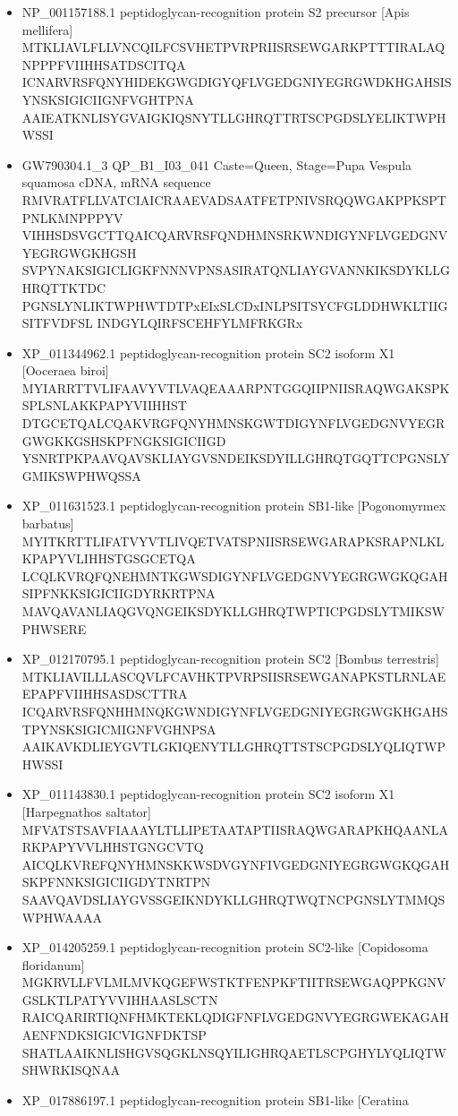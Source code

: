 \documentclass[]{article}
\providecommand{\tightlist}{%
  \setlength{\itemsep}{0pt}\setlength{\parskip}{0pt}}
\begin{document}
\begin{itemize}
\tightlist
\item
  NP\_001157188.1 peptidoglycan-recognition protein S2 precursor {[}Apis
  mellifera{]}
  MTKLIAVLFLLVNCQILFCSVHETPVRPRIISRSEWGARKPTTTIRALAQNPPPFVIIHHSATDSCITQA
  ICNARVRSFQNYHIDEKGWGDIGYQFLVGEDGNIYEGRGWDKHGAHSISYNSKSIGICIIGNFVGHTPNA
  AAIEATKNLISYGVAIGKIQSNYTLLGHRQTTRTSCPGDSLYELIKTWPHWSSI
\item
  GW790304.1\_3 QP\_B1\_I03\_041 Caste=Queen, Stage=Pupa Vespula
  squamosa cDNA, mRNA sequence
  RMVRATFLLVATCIAICRAAEVADSAATFETPNIVSRQQWGAKPPKSPTPNLKMNPPPYV
  VIHHSDSVGCTTQAICQARVRSFQNDHMNSRKWNDIGYNFLVGEDGNVYEGRGWGKHGSH
  SVPYNAKSIGICLIGKFNNNVPNSASIRATQNLIAYGVANNKIKSDYKLLGHRQTTKTDC
  PGNSLYNLIKTWPHWTDTPxEIxSLCDxINLPSITSYCFGLDDHWKLTIIGSITFVDFSL
  INDGYLQIRFSCEHFYLMFRKGRx
\item
  XP\_011344962.1 peptidoglycan-recognition protein SC2 isoform X1
  {[}Ooceraea biroi{]}
  MYIARRTTVLIFAAVYVTLVAQEAAARPNTGGQIIPNIISRAQWGAKSPKSPLSNLAKKPAPYVIIHHST
  DTGCETQALCQAKVRGFQNYHMNSKGWTDIGYNFLVGEDGNVYEGRGWGKKGSHSKPFNGKSIGICIIGD
  YSNRTPKPAAVQAVSKLIAYGVSNDEIKSDYILLGHRQTGQTTCPGNSLYGMIKSWPHWQSSA
\item
  XP\_011631523.1 peptidoglycan-recognition protein SB1-like
  {[}Pogonomyrmex barbatus{]}
  MYITKRTTLIFATVYVTLIVQETVATSPNIISRSEWGARAPKSRAPNLKLKPAPYVLIHHSTGSGCETQA
  LCQLKVRQFQNEHMNTKGWSDIGYNFLVGEDGNVYEGRGWGKQGAHSIPFNKKSIGICIIGDYRKRTPNA
  MAVQAVANLIAQGVQNGEIKSDYKLLGHRQTWPTICPGDSLYTMIKSWPHWSERE
\item
  XP\_012170795.1 peptidoglycan-recognition protein SC2 {[}Bombus
  terrestris{]}
  MTKLIAVILLLASCQVLFCAVHKTPVRPSIISRSEWGANAPKSTLRNLAEEPAPFVIIHHSASDSCTTRA
  ICQARVRSFQNHHMNQKGWNDIGYNFLVGEDGNIYEGRGWGKHGAHSTPYNSKSIGICMIGNFVGHNPSA
  AAIKAVKDLIEYGVTLGKIQENYTLLGHRQTTSTSCPGDSLYQLIQTWPHWSSI
\item
  XP\_011143830.1 peptidoglycan-recognition protein SC2 isoform X1
  {[}Harpegnathos saltator{]}
  MFVATSTSAVFIAAAYLTLLIPETAATAPTIISRAQWGARAPKHQAANLARKPAPYVVLHHSTGNGCVTQ
  AICQLKVREFQNYHMNSKKWSDVGYNFIVGEDGNIYEGRGWGKQGAHSKPFNNKSIGICIIGDYTNRTPN
  SAAVQAVDSLIAYGVSSGEIKNDYKLLGHRQTWQTNCPGNSLYTMMQSWPHWAAAA
\item
  XP\_014205259.1 peptidoglycan-recognition protein SC2-like
  {[}Copidosoma floridanum{]}
  MGKRVLLFVLMLMVKQGEFWSTKTFENPKFTIITRSEWGAQPPKGNVGSLKTLPATYVVIHHAASLSCTN
  RAICQARIRTIQNFHMKTEKLQDIGFNFLVGEDGNVYEGRGWEKAGAHAENFNDKSIGICVIGNFDKTSP
  SHATLAAIKNLISHGVSQGKLNSQYILIGHRQAETLSCPGHYLYQLIQTWSHWRKISQNAA
\item
  XP\_017886197.1 peptidoglycan-recognition protein SB1-like {[}Ceratina

\end{itemize}
\end{document}
